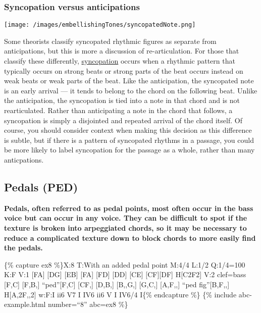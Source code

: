 \documentclass{book}
\begin{document}
\hypertarget{syncopation-versus-anticipations}{%
\subsubsection{Syncopation versus
anticipations}\label{syncopation-versus-anticipations}}

\texttt{[image: /images/embellishingTones/syncopatedNote.png]}

Some theorists classify syncopated rhythmic figures as separate from
anticipations, but this is more a discussion of re-articulation. For those
that classify these differently,
\href{http://openmusictheory.com/syncopation.html}{syncopation} occurs when a
rhythmic pattern that typically occurs on strong beats or strong parts of the
beat occurs instead on weak beats or weak parts of the beat. Like the
anticipation, the syncopated note is an early arrival --- it tends to belong
to the chord on the following beat. Unlike the anticipation, the syncopation
is tied into a note in that chord and is not rearticulated. Rather than
anticipating a note in the chord that follows, a syncopation is simply a
disjointed and repeated arrival of the chord itself. Of course, you should
consider context when making this decision as this difference is subtle, but
if there is a pattern of syncopated rhythms in a passage, you could be more
likely to label syncopation for the passage as a whole, rather than many
anticpations.

\hypertarget{pedals-ped}{%
\subsection{Pedals (PED)}\label{pedals-ped}}

\textbf{Pedals, often referred to as pedal points, most often occur in the
bass voice but can occur in any voice. They can be difficult to spot if the
texture is broken into arpeggiated chords, so it may be necessary to reduce a
complicated texture down to block chords to more easily find the pedals.}

\{\% capture ex8 \%\}X:8 T:With an added pedal point M:4/4 L:1/2 Q:1/4=100 K:F
V:1 {[}FA{]}\textbar{} {[}DG{]} {[}EB{]}\textbar{} {[}FA{]} {[}FD{]}\textbar{}
{[}DD{]} {[}CE{]}\textbar{} {[}CF{]}{[}DF{]}\textbar{} H{[}C2F2{]}\textbar{]}
V:2 clef=bass {[}F,C{]}\textbar{} {[}F,B,{]} ``ped''{[}F,C{]}\textbar{}
{[}CF,{]} {[}D,B,{]}\textbar{} {[}B,,G,{]} {[}G,C,{]}\textbar{} {[}A,F,,{]}
``ped fig''{[}B,F,,{]}\textbar{} H{[}A,2F,,2{]}\textbar{]} w:F:I ii6 V7 I IV6
ii6 V I IV6/4 I\{\% endcapture \%\} \{\% include abc-example.html number=``8''
abc=ex8 \%\}
\end{document}
